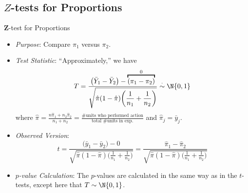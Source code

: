 \subsection{\texorpdfstring{$ Z $}{Z}-tests for Proportions}
\begin{Statistical_Test}{$ \symbf{Z} $-test for Proportions}{}
      \begin{itemize}
            \item \emph{Purpose}: Compare $ \pi_1 $ versus $ \pi_2 $.
            \item \emph{Test Statistic}: ``Approximately,'' we have
                  \[ T=\frac{\bigl(\bar{Y}_1-\bar{Y}_2\bigr)-
                              \overbracket{(\pi_1-\pi_2)}^0}{\displaystyle \sqrt{\hat{\pi}(1-\hat{\pi})\biggl(\frac{1}{n_1} +\frac{1}{n_2} \biggr)}}\stackrel{\cdot}{\sim}\N{0,1} \]
                  where $ \displaystyle \hat{\pi}=\frac{n\hat{\pi}_1+n_2\hat{\pi}_2}{n_1+n_2}=\frac{\text{\# units who performed action}}{\text{total \# units in exp.}} $
                  and $ \hat{\pi}_j=\bar{y}_j $.
            \item \emph{Observed Version}:
                  \[ t=\frac{\bigl(\bar{y}_1-\bar{y}_2\bigr)-0}{\displaystyle \sqrt{\hat{\pi}(1-\hat{\pi})\biggl(\frac{1}{n_1} +\frac{1}{n_2} \biggr)}}=
                        \frac{\hat{\pi}_1-\hat{\pi}_2}{\displaystyle \sqrt{\hat{\pi}(1-\hat{\pi})\biggl(\frac{1}{n_1} +\frac{1}{n_2} \biggr)}}\]
            \item \emph{$ p $-value Calculation}: The $ p $-values are calculated
                  in the same way as in the $ t $-tests, except here that $ T \sim \N{0,1} $.
      \end{itemize}
\end{Statistical_Test}
